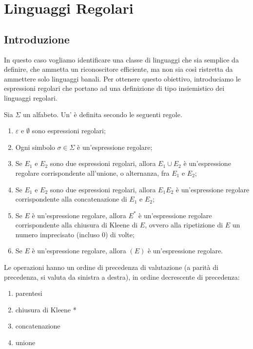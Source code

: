 \chapter{Linguaggi Regolari}\label{cha:Linguaggi-regolari}




\section{Introduzione}\label{sec:regolari-introduzione}

In questo caso vogliamo identificare una classe di linguaggi che sia semplice da definire, che ammetta un riconoscitore
efficiente, ma non sia così ristretta da ammettere solo linguaggi banali.
Per ottenere questo obiettivo, introduciamo le espressioni regolari che portano ad una definizione di tipo
insiemistico dei linguaggi regolari.

\begin{definition}\label{def:regex}
	Sia $\Sigma$ un alfabeto. Un' è definita secondo le seguenti regole.
	\begin{enumerate}
		\item $\varepsilon$ e $\emptyset$ sono espressioni regolari;
		\item Ogni simbolo $\sigma\in\Sigma$ è un'espressione regolare;
		\item Se $E_1$ e $E_2$ sono due espressioni regolari, allora $E_1 \cup E_2$ è un'espressione regolare corrispondente
		      all'unione, o alternanza, fra $E_1$ e $E_2$;
		\item Se $E_1$ e $E_2$ sono due espressioni regolari, allora $E_1 E_2$ è un'espressione regolare corrispondente
		      alla concatenazione di $E_1$ e $E_2$;
		\item Se $E$ è un'espressione regolare, allora $E^{*}$ è un'espressione regolare corrispondente
		      alla chiusura di Kleene di $E$, ovvero alla ripetizione di $E$ un numero imprecisato (incluso $0$) di volte;
		\item Se $E$ è un'espressione regolare, allora $(E)$ è un'espressione regolare.
	\end{enumerate}
\end{definition}

Le operazioni hanno un ordine di precedenza di valutazione (a parità di precedenza, si valuta da sinistra a destra), in
ordine decrescente di precedenza:
\begin{enumerate}
	\item parentesi
	\item chiusura di Kleene *
	\item concatenazione
	\item unione
\end{enumerate}



